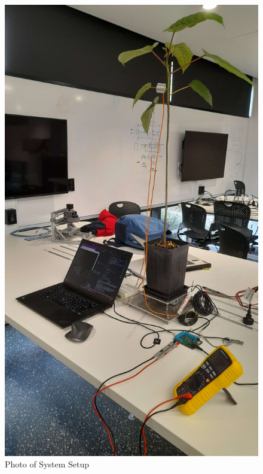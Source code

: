 \begin{figure}[ht]
\begin{minipage}[b]{0.4\linewidth}
        \includegraphics[width=\linewidth]{figures/system_setup_1.jpg}
        \caption{Photo of System Setup}
        \label{system_photo}
    \end{minipage}
\end{figure}

